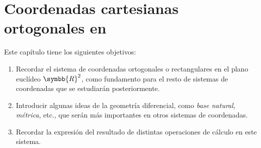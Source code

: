 %


\chapter{Coordenadas cartesianas ortogonales en
  }
Este capítulo tiene los siguientes objetivos:
\begin{enumerate}
\item Recordar el sistema de coordenadas ortogonales o rectangulares en el
  plano euclídeo $\symbb{R}^2$, como fundamento para el resto de sistemas de
  coordenadas que se estudiarán posteriormente.
\item Introducir algunas ideas de la geometría diferencial, como
  \emph{base natural}, \emph{métrica}, etc., que serán más importantes en otros
  sistemas de coordenadas.
\item Recordar la expresión del resultado de distintas operaciones de cálculo en
  este sistema.
\end{enumerate}

